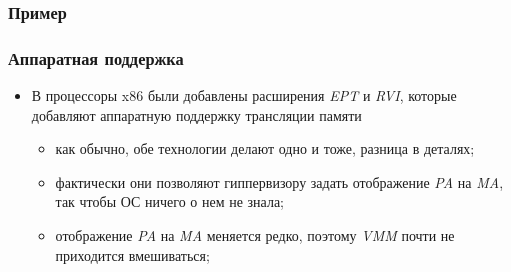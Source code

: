 \begin{frame}
\frametitle{Пример}
\end{frame}

\begin{frame}
\frametitle{Аппаратная поддержка}
\begin{itemize}
  \item В процессоры x86 были добавлены расширения \emph{EPT} и \emph{RVI},
        которые добавляют аппаратную поддержку трансляции памяти
    \begin{itemize}
      \item как обычно, обе технологии делают одно и тоже, разница в деталях;
      \item фактически они позволяют гиппервизору задать отображение \emph{PA}
            на \emph{MA}, так чтобы ОС ничего о нем не знала;
      \item отображение \emph{PA} на \emph{MA} меняется редко, поэтому
            \emph{VMM} почти не приходится вмешиваться;
    \end{itemize}
\end{itemize}
\end{frame}

